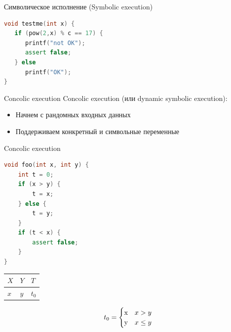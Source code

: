 \documentclass{beamer}
\begin{document}
\begin{frame}[fragile]{Символическое исполнение (Symbolic execution)}
\begin{minipage}{0.49\textwidth}
\begin{lstlisting}[language=C++]
void testme(int x) {
   if (pow(2,x) % c == 17) {
      printf("not OK");
      assert false;
   } else
      printf("OK");
}
\end{lstlisting}
\end{minipage}
\end{frame}


\begin{frame}[fragile]{Concolic execution}
Concolic execution (или dynamic symbolic execution):
\begin{itemize}
\item Начнем с рандомных входных данных
\item Поддерживаем конкретный и символьные переменные
\end{itemize}
\end{frame}

\begin{frame}[fragile]{Concolic execution}
\begin{minipage}{0.49\textwidth}
\begin{lstlisting}[language=C++,escapechar=@]
void foo(int x, int y) {
    int t = 0;
    if (x > y) {
        t = x;
    } else {
        t = y;
    }
    if (t < x) {
        assert false;
    }
}
\end{lstlisting}
\end{minipage}
\hfill
\begin{minipage}{0.49\textwidth}
\begin{center}
\begin{tabular}{ | l | l | l | }
\hline
$X$ & $Y$ & $T$ \\
\hline
$x$ & $y$ & $t_0$ \\
\hline
\end{tabular}
\begin{equation*}
t_0 =
    \begin{cases}
    $x$ &\text{$x > y$}\\
    $y$ &\text{$x \le y$}
    \end{cases}
\end{equation*}
\end{center}
\end{minipage}
\end{frame}
\end{document}
